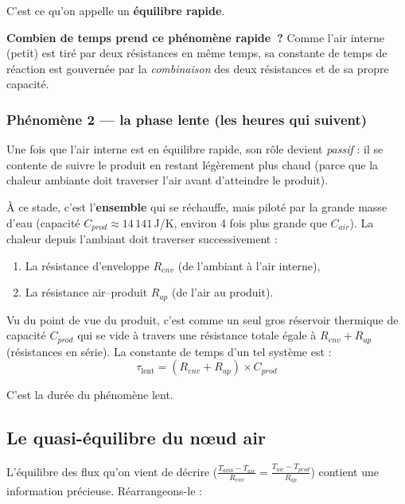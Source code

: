 \documentclass[11pt,a4paper]{article}
\begin{document}
C'est ce qu'on appelle un \textbf{équilibre rapide}.

\textbf{Combien de temps prend ce phénomène rapide~?} Comme l'air interne (petit) est tiré
par deux résistances en même temps, sa constante de temps de réaction est gouvernée par
la \emph{combinaison} des deux résistances et de sa propre capacité.

\subsubsection*{Phénomène 2 — la phase lente (les heures qui suivent)}

Une fois que l'air interne est en équilibre rapide, son rôle devient \emph{passif} : il se
contente de suivre le produit en restant légèrement plus chaud (parce que la chaleur
ambiante doit traverser l'air avant d'atteindre le produit).

À ce stade, c'est l'\textbf{ensemble} qui se réchauffe, mais piloté par la grande masse
d'eau (capacité $C_{prod} \approx 14\,141\,$J/K, environ 4 fois plus grande que $C_{air}$).
La chaleur depuis l'ambiant doit traverser successivement :
\begin{enumerate}[itemsep=0pt]
\item La résistance d'enveloppe $R_{env}$ (de l'ambiant à l'air interne),
\item La résistance air--produit $R_{ap}$ (de l'air au produit).
\end{enumerate}

Vu du point de vue du produit, c'est comme un seul gros réservoir thermique de capacité
$C_{prod}$ qui se vide à travers une résistance totale égale à $R_{env} + R_{ap}$
(résistances en série). La constante de temps d'un tel système est :
$$\tau_{\text{lent}} = (R_{env} + R_{ap}) \times C_{prod}$$

C'est la durée du phénomène lent.

\subsection{Le quasi-équilibre du nœud air}

L'équilibre des flux qu'on vient de décrire ($\frac{T_{amb}-T_{air}}{R_{env}} = \frac{T_{air}-T_{prod}}{R_{ap}}$)
contient une information précieuse. Réarrangeons-le :
\end{document}
